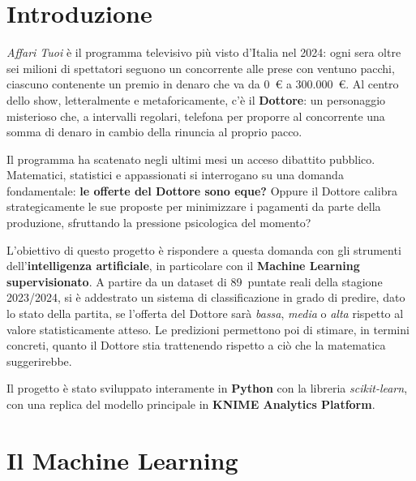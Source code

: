 \documentclass[12pt, a4paper]{article}
\begin{document}
\tableofcontents
\thispagestyle{empty}
\newpage
\setcounter{page}{1}

\section{Introduzione}

\textit{Affari Tuoi} è il programma televisivo più visto d'Italia nel 2024:
ogni sera oltre sei milioni di spettatori seguono un concorrente alle prese con
ventuno pacchi, ciascuno contenente un premio in denaro che va da 0~€ a 300.000~€.
Al centro dello show, letteralmente e metaforicamente, c'è il \textbf{Dottore}: un
personaggio misterioso che, a intervalli regolari, telefona per proporre al concorrente
una somma di denaro in cambio della rinuncia al proprio pacco.

Il programma ha scatenato negli ultimi mesi un acceso dibattito pubblico.
Matematici, statistici e appassionati si interrogano su una domanda fondamentale:
\textbf{le offerte del Dottore sono eque?} Oppure il Dottore calibra
strategicamente le sue proposte per minimizzare i pagamenti da parte della
produzione, sfruttando la pressione psicologica del momento?

L'obiettivo di questo progetto è rispondere a questa domanda con gli strumenti
dell'\textbf{intelligenza artificiale}, in particolare con il \textbf{Machine
Learning supervisionato}. A partire da un dataset di 89~puntate reali della
stagione 2023/2024, si è addestrato un sistema di classificazione in grado di
predire, dato lo stato della partita, se l'offerta del Dottore sarà
\textit{bassa}, \textit{media} o \textit{alta} rispetto al valore
statisticamente atteso. Le predizioni permettono poi di stimare, in termini
concreti, quanto il Dottore stia trattenendo rispetto a ciò che la matematica
suggerirebbe.

Il progetto è stato sviluppato interamente in \textbf{Python} con la libreria
\textit{scikit-learn}, con una replica del modello principale in
\textbf{KNIME Analytics Platform}.

\section{Il Machine Learning}
\end{document}
